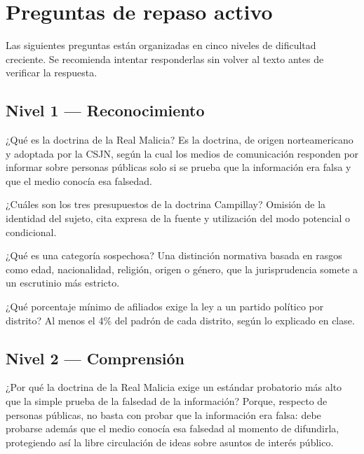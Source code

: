 \documentclass[12pt,oneside]{book}
\begin{document}
\section{Preguntas de repaso activo}

Las siguientes preguntas están organizadas en cinco niveles de dificultad creciente. Se recomienda intentar responderlas sin volver al texto antes de verificar la respuesta.

\subsection*{Nivel 1 --- Reconocimiento}

\begin{exercise}{¿Qué es la doctrina de la Real Malicia?}
Es la doctrina, de origen norteamericano y adoptada por la CSJN, según la cual los medios de comunicación responden por informar sobre personas públicas solo si se prueba que la información era falsa y que el medio conocía esa falsedad.
\end{exercise}

\begin{exercise}{¿Cuáles son los tres presupuestos de la doctrina Campillay?}
Omisión de la identidad del sujeto, cita expresa de la fuente y utilización del modo potencial o condicional.
\end{exercise}

\begin{exercise}{¿Qué es una categoría sospechosa?}
Una distinción normativa basada en rasgos como edad, nacionalidad, religión, origen o género, que la jurisprudencia somete a un escrutinio más estricto.
\end{exercise}

\begin{exercise}{¿Qué porcentaje mínimo de afiliados exige la ley a un partido político por distrito?}
Al menos el 4\% del padrón de cada distrito, según lo explicado en clase.
\end{exercise}

\subsection*{Nivel 2 --- Comprensión}

\begin{exercise}{¿Por qué la doctrina de la Real Malicia exige un estándar probatorio más alto que la simple prueba de la falsedad de la información?}
Porque, respecto de personas públicas, no basta con probar que la información era falsa: debe probarse además que el medio conocía esa falsedad al momento de difundirla, protegiendo así la libre circulación de ideas sobre asuntos de interés público.
\end{exercise}
\end{document}
